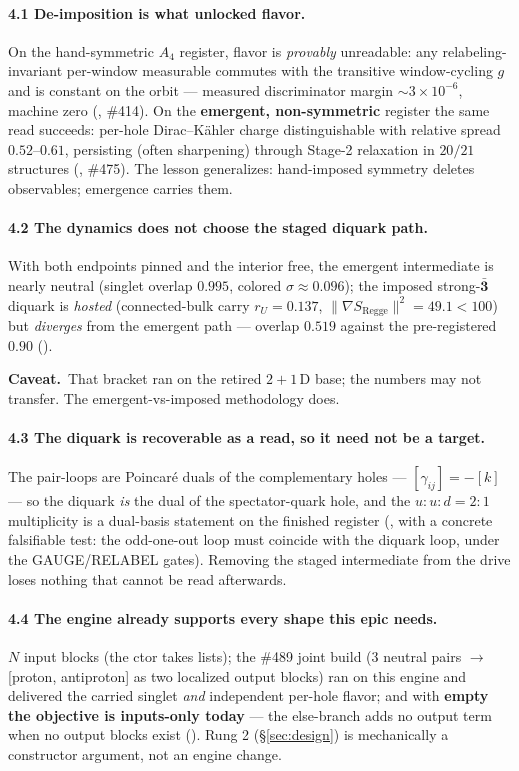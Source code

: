 \documentclass[11pt]{article}
\newcommand{\rep}[1]{\mathbf{#1}}
\newcommand{\norm}[1]{\lVert #1 \rVert}
\newcommand{\rU}{r_{U}}
\newcommand{\gradS}{\norm{\nabla S_{\mathrm{Regge}}}^2}
\newcommand{\caveat}[1]{\par\medskip\noindent\textcolor{red!60!black}{\textbf{Caveat.}}\ #1\par\medskip}
\begin{document}
\paragraph{4.1 De-imposition is what unlocked flavor.}
On the hand-symmetric $A_4$ register, flavor is \emph{provably} unreadable: any
relabeling-invariant per-window measurable commutes with the transitive window-cycling
$g$ and is constant on the orbit --- measured discriminator margin $\sim 3\times10^{-6}$,
machine zero (, \#414). On the \textbf{emergent,
non-symmetric} register the same read succeeds: per-hole Dirac--K\"ahler charge
distinguishable with relative spread $0.52$--$0.61$, persisting (often sharpening)
through Stage-2 relaxation in $20/21$ structures
(, \#475). The lesson generalizes:
hand-imposed symmetry deletes observables; emergence carries them.

\paragraph{4.2 The dynamics does not choose the staged diquark path.}
With both endpoints pinned and the interior free, the emergent intermediate is nearly
neutral (singlet overlap $0.995$, colored $\sigma \approx 0.096$); the imposed
strong-$\bar{\rep{3}}$ diquark is \emph{hosted} (connected-bulk carry $\rU = 0.137$,
$\gradS = 49.1 < 100$) but \emph{diverges} from the emergent path --- overlap $0.519$
against the pre-registered $0.90$
().
\caveat{That bracket ran on the retired $2{+}1$\,D base; the numbers may not transfer.
The emergent-vs-imposed methodology does.}

\paragraph{4.3 The diquark is recoverable as a read, so it need not be a target.}
The pair-loops are Poincar\'e duals of the complementary holes --- $[\gamma_{ij}] = -[k]$
--- so the diquark \emph{is} the dual of the spectator-quark hole, and the
$u{:}u{:}d = 2{:}1$ multiplicity is a dual-basis statement on the finished register
(, with a concrete falsifiable test: the odd-one-out loop
must coincide with the diquark loop, under the GAUGE/RELABEL gates). Removing the staged
intermediate from the drive loses nothing that cannot be read afterwards.

\paragraph{4.4 The engine already supports every shape this epic needs.}
$N$ input blocks (the ctor takes lists); the \#489 joint build (3 neutral pairs $\to$
[proton, antiproton] as two localized output blocks) ran on this engine and delivered the
carried singlet \emph{and} independent per-hole flavor; and with \textbf{
empty the objective is inputs-only today} --- the  else-branch adds no output
term when no output blocks exist (). Rung 2
(\S\ref{sec:design}) is mechanically a constructor argument, not an engine change.
\end{document}

